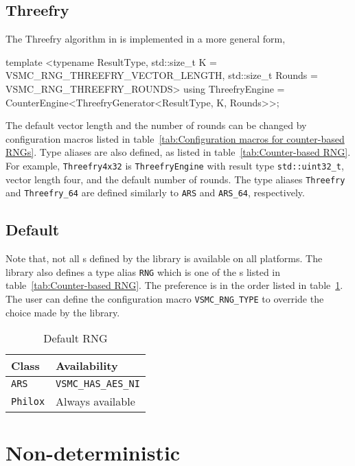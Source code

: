 \subsection{Threefry}
\label{sub:Threefry}

The Threefry algorithm in \textcite{Salmon:2011um} is implemented in a more
general form,
\begin{cppcode}
  template <typename ResultType, std::size_t K = VSMC_RNG_THREEFRY_VECTOR_LENGTH,
      std::size_t Rounds = VSMC_RNG_THREEFRY_ROUNDS>
  using ThreefryEngine = CounterEngine<ThreefryGenerator<ResultType, K, Rounds>>;
\end{cppcode}
The default vector length and the number of rounds can be changed by
configuration macros listed in table~\ref{tab:Configuration macros for
  counter-based RNGs}. Type aliases are also defined, as listed in
table~\ref{tab:Counter-based RNG}. For example, \verb|Threefry4x32| is
\verb|ThreefryEngine| with result type \verb|std::uint32_t|, vector length
four, and the default number of rounds. The type aliases \verb|Threefry| and
\verb|Threefry_64| are defined similarly to \verb|ARS| and \verb|ARS_64|,
respectively.

\subsection{Default \protect\rng}
\label{sub:Default RNG}

Note that, not all \rng{}s defined by the library is available on all
platforms. The library also defines a type alias \verb|RNG| which is one of the
\rng{}s listed in table~\ref{tab:Counter-based RNG}. The preference is in the
order listed in table~\ref{tab:Default RNG}. The user can define the
configuration macro \verb|VSMC_RNG_TYPE| to override the choice made by the
library.

\begin{table}
  \begin{tabularx}{\textwidth}{XX}
    \toprule
    Class & Availability \\
    \midrule
    \verb|ARS|    & \verb|VSMC_HAS_AES_NI| \\
    \verb|Philox| & Always available       \\
    \bottomrule
  \end{tabularx}
  \caption{Default RNG}
  \label{tab:Default RNG}
\end{table}

\section{Non-deterministic \protect\rng}
\label{sec:Non-deterministic RNG}

